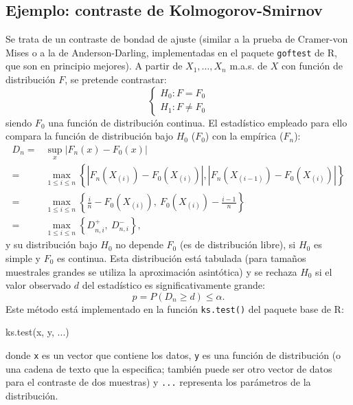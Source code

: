 \documentclass[
]{book}
\newenvironment{Shaded}{\begin{snugshade}}{\end{snugshade}}
\newcommand{\FunctionTok}[1]{\textcolor[rgb]{0.00,0.00,0.00}{#1}}
\newcommand{\NormalTok}[1]{#1}
\theoremstyle{break}
\theoremstyle{definition}
\theoremstyle{definition}
\theoremstyle{definition}
\theoremstyle{definition}
\theoremstyle{remark}
\begin{document}
\hypertarget{ejemplo-contraste-de-kolmogorov-smirnov}{%
\subsection{Ejemplo: contraste de Kolmogorov-Smirnov}\label{ejemplo-contraste-de-kolmogorov-smirnov}}

Se trata de un contraste de bondad de ajuste (similar a la prueba de
Cramer-von Mises o a la de Anderson-Darling, implementadas en el paquete
\texttt{goftest} de R, que son en principio mejores).
A partir de \(X_1,\ldots ,X_n\) m.a.s. de \(X\) con función de distribución \(F\),
se pretende contrastar:
\[\left \{ 
\begin{array}{l}
H_0 : F = F_0 \\ 
H_1 : F \neq F_0 
\end{array}
\right. \]
siendo \(F_0\) una función de distribución continua.
El estadístico empleado para ello compara la función de distribución bajo
\(H_0\) (\(F_0\)) con la empírica (\(F_n\)):
\[\begin{aligned}
    D_n=&\sup_{x}|F_n(x)-F_0(x)| \\
    =&\max_{1 \leq i\leq n}\left \{
    |F_n(X_{(i)})-F_0(X_{(i)})|,|F_n(X_{(i-1)})-F_0(X_{(i)})|\right \} \\
    =&\max_{1 \leq i\leq n}\left \{ \frac{i}{n}-F_0(X_{(i)}), \ F_0(X_{(i)})-\frac{i-1}{n}\right \} \\
    =&\max_{1 \leq i\leq n}\left \{ D_{n,i}^{+},\ D_{n,i}^{-}\right \},
\end{aligned}\]
y su distribución bajo \(H_0\) no depende \(F_0\) (es de distribución libre),
si \(H_0\) es simple y \(F_0\) es continua.
Esta distribución está tabulada (para tamaños muestrales grandes se utiliza
la aproximación asintótica) y se rechaza \(H_0\) si el valor observado \(d\)
del estadístico es significativamente grande:
\[p = P \left( D_n \geq d \right) \leq \alpha.\]
Este método está implementado en la función \texttt{ks.test()} del paquete base de R:

\begin{Shaded}
\begin{Highlighting}[]
\FunctionTok{ks.test}\NormalTok{(x, y, ...)}
\end{Highlighting}
\end{Shaded}

donde \texttt{x} es un vector que contiene los datos, \texttt{y} es una función de distribución
(o una cadena de texto que la especifica; también puede ser otro vector de datos
para el contraste de dos muestras) y \texttt{...} representa los parámetros de la distribución.
\end{document}
